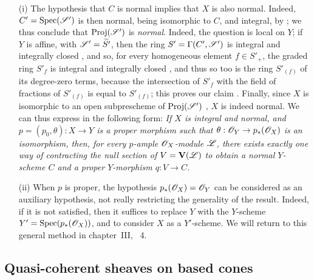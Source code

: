 \begin{remark}[8.11.8]
\label{II.8.11.8}
\begin{itemize}
    \item[\rm{(i)}] The hypothesis that $C$ is normal implies that $X$ is also normal.
        Indeed, $C'=\operatorname{Spec}(\mathscr{S}')$ is then normal, being isomorphic to $C$, and integral, by ;
        we thus conclude that $\operatorname{Proj}(\mathscr{S}')$ is \emph{normal}.
        Indeed, the question is local on $Y$;
        if $Y$ is affine, with $\mathscr{S}'=\widetilde{S'}$, then the ring $S'=\Gamma(C',\mathscr{S}')$ is integral and integrally closed , and so, for every homogeneous element $f\in S'_+$, the graded ring $S'_f$ is integral and integrally closed \cite[t.~I, p.~257 and 261]{I-13}, and thus so too is the ring $S'_{(f)}$ of its degree-zero terms, because the intersection of $S'_f$ with the field of fractions of $S'_{(f)}$ is equal to $S'_{(f)}$;
        this proves our claim .
        Finally, since $X$ is isomorphic to an open subprescheme of $\operatorname{Proj}(\mathscr{S}')$ , $X$ is indeed normal.
        We can thus express  in the following form:
        \emph{If $X$ is integral and normal, and $p=(p_0,\theta):X\to Y$ is a proper morphism such that $\theta:\sh{O}_Y\to p_*(\sh{O}_X)$ is an isomorphism, then, for every $p$-ample $\mathscr{O}_X$-module $\mathscr{L}$, there exists exactly one way of contracting the null section of $V=\mathbf{V}(\mathscr{L})$ to obtain a normal $Y$-scheme $C$ and a proper $Y$-morphism $q:V\to C$.}
    \item[\rm{(ii)}] When $p$ is proper, the hypothesis $p_*(\mathscr{O}_X)=\mathscr{O}_Y$ can be considered as an auxiliary hypothesis, not really restricting the generality of the result.
        Indeed, if it is not satisfied, then it suffices to replace $Y$ with the $Y$-scheme $Y'=\operatorname{Spec}(p_*(\mathscr{O}_X))$, and to consider $X$ as a $Y'$-scheme.
        We will return to this general method in chapter~III, \textsection~4.
\end{itemize}
\end{remark}


\subsection{Quasi-coherent sheaves on based cones}
\label{subsection:2.8.12}

